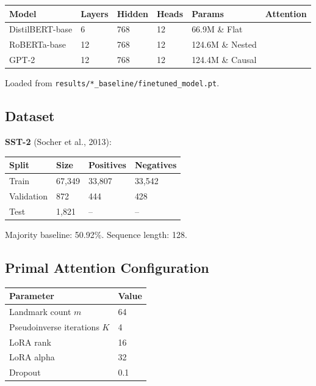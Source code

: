 \begin{table}[H]
\centering
\small
\begin{tabular}{llllll}
\toprule
\textbf{Model} & \textbf{Layers} & \textbf{Hidden} & \textbf{Heads} & \textbf{Params} & \textbf{Attention} \\
\midrule
DistilBERT-base & 6 & 768 & 12 & 66.9M \& Flat \\
RoBERTa-base & 12 & 768 & 12 & 124.6M \& Nested \\
GPT-2 & 12 & 768 & 12 & 124.4M \& Causal \\
\bottomrule
\end{tabular}
\end{table}

Loaded from \texttt{results/*\_baseline/finetuned\_model.pt}.

\subsection{Dataset}

\textbf{SST-2} (Socher et al., 2013):

\begin{table}[H]
\centering
\small
\begin{tabular}{llll}
\toprule
\textbf{Split} & \textbf{Size} & \textbf{Positives} & \textbf{Negatives} \\
\midrule
Train & 67,349 & 33,807 & 33,542 \\
Validation & 872 & 444 & 428 \\
Test & 1,821 & -- & -- \\
\bottomrule
\end{tabular}
\end{table}

Majority baseline: 50.92\%. Sequence length: 128.

\subsection{Primal Attention Configuration}

\begin{table}[H]
\centering
\small
\begin{tabular}{ll}
\toprule
\textbf{Parameter} & \textbf{Value} \\
\midrule
Landmark count $m$ & 64 \\
Pseudoinverse iterations $K$ & 4 \\
LoRA rank & 16 \\
LoRA alpha & 32 \\
Dropout & 0.1 \\
\bottomrule
\end{tabular}
\end{table}

